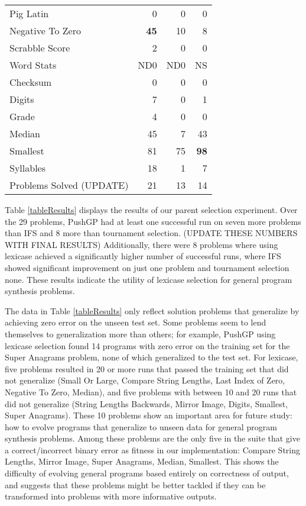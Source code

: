 \documentclass{sig-alternate}
\begin{document}
\begin{table}[t]
\begin{tabular}{|l|rrr|}
Pig Latin                  & 0        & 0       & 0   \\
Negative To Zero           & \textbf{45}       & 10      & 8   \\
Scrabble Score             & 2        & 0       & 0    \\
Word Stats                 & ND0      & ND0     &  NS   \\
Checksum                   & 0         & 0        & 0    \\
Digits                     & 7        & 0       & 1   \\
Grade                      & 4        & 0       & 0   \\
Median                     & 45       & 7       & 43  \\
Smallest                   & 81       & 75      & \textbf{98}  \\
Syllables                  & 18       & 1       & 7   \\
\hline
Problems Solved (UPDATE)           & 21       & 13      & 14   \\
\hline
\end{tabular}
\end{table}


Table \ref{tableResults} displays the results of our parent selection experiment. Over the 29 problems, PushGP had at least one successful run on seven more problems than IFS and 8 more than tournament selection.
(UPDATE THESE NUMBERS WITH FINAL RESULTS)
Additionally, there were 8 problems where using lexicase achieved a significantly higher number of successful runs, where IFS showed significant improvement on just one problem and tournament selection none. These results indicate the utility of lexicase selection for general program synthesis problems.



The data in Table \ref{tableResults} only reflect solution problems that generalize by achieving zero error on the unseen test set. Some problems seem to lend themselves to generalization more than others; for example, PushGP using lexicase selection found 14 programs with zero error on the training set for the Super Anagrams problem, none of which generalized to the test set. For lexicase, five problems resulted in 20 or more runs that passed the training set that did not generalize (Small Or Large,
Compare String Lengths,
Last Index of Zero,
Negative To Zero,
Median),
and five problems with between 10 and 20 runs that did not generalize (String Lengths Backwards,
Mirror Image,
Digits,
Smallest,
Super Anagrams).
These 10 problems show an important area for future study: how to evolve programs that generalize to unseen data for general program synthesis problems. Among these problems are the only five in the suite that give a correct/incorrect binary error as fitness in our implementation: Compare String Lengths, Mirror Image, Super Anagrams, Median, Smallest. This shows the difficulty of evolving general programs based entirely on correctness of output, and suggests that these problems might be better tackled if they can be transformed into problems with more informative outputs.
\end{document}
